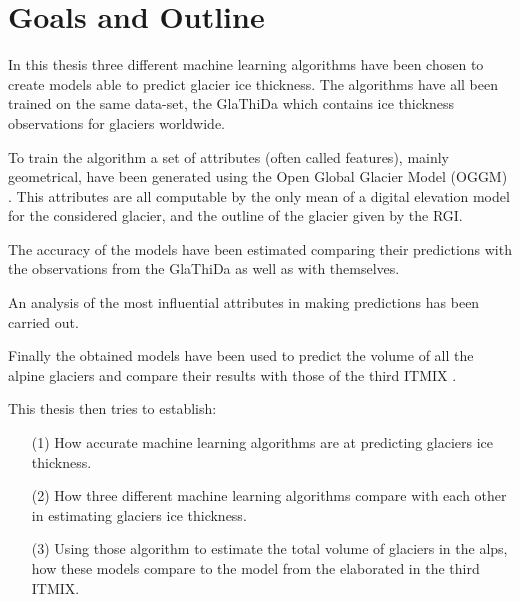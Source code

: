 \section{Goals and Outline}\label{goals}
In this thesis three different machine learning algorithms have been chosen to  create models able to predict glacier ice thickness. The algorithms have all been trained on the same data-set, the GlaThiDa which contains ice thickness observations for glaciers worldwide.

To train the algorithm a set of attributes (often called features), mainly geometrical, have been generated using the Open Global Glacier Model (OGGM) \citep{OGGM2019}. This attributes are all computable by the only mean of a digital elevation model for the considered glacier, and the outline of the glacier given by the RGI.

The accuracy of the models have been estimated comparing their predictions with the observations from the GlaThiDa as well as with themselves.

An analysis of the most influential attributes in making predictions has been carried out.

Finally the obtained models have been used to predict the volume of all the alpine glaciers and compare their results with those of the third ITMIX \citep{Farinotti2019}.


This thesis then tries to establish:
\begin{itemize}
\item[(1)] How accurate machine learning algorithms are at predicting glaciers ice thickness.
\item[(2)] How three different machine learning algorithms compare with each other in estimating glaciers ice thickness.
\item[(3)] Using those algorithm to estimate the total volume of glaciers in the alps, how these models compare to the model from the \cite{Farinotti2019} elaborated in the third ITMIX.
\end{itemize}

%
%
